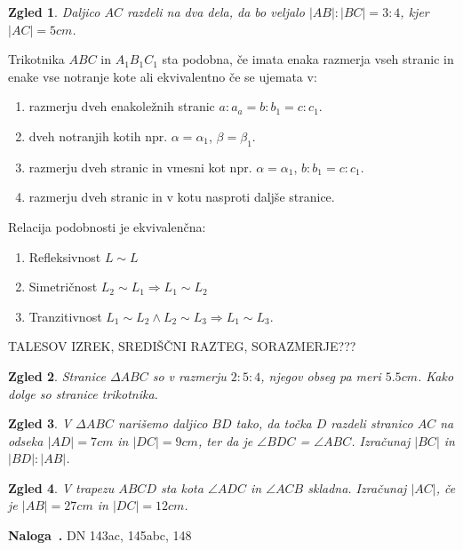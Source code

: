 \documentclass{article}
\newcounter{example}[section]
\newenvironment{example}[1][]{\refstepcounter{example}\par\medskip
   \noindent \textbf{Naloga~\theexample. #1} \rmfamily}{\medskip}
\newtheorem*{zgled}{Zgled}
\begin{document}
\begin{zgled}
    Daljico $AC$ razdeli na dva dela, da bo veljalo $|AB|:|BC|=3:4$, kjer $|AC|=5cm$.
\end{zgled}

Trikotnika $ABC$ in $A_1 B_1 C_1$ sta podobna, če imata enaka razmerja vseh stranic in enake vse notranje kote ali ekvivalentno če se ujemata v:
\begin{enumerate}[i]
    \item razmerju dveh enakoležnih stranic $a:a_a = b:b_1 =c: c_1$.
    \item dveh notranjih kotih npr. $\alpha = \alpha_1$, $\beta =\beta_1$.
    \item razmerju dveh stranic in vmesni kot npr. $\alpha =\alpha_1$, $b:b_1 = c: c_1$.
    \item razmerju dveh stranic in v kotu nasproti daljše stranice.
  \end{enumerate}

  Relacija podobnosti je ekvivalenčna:
  \begin{enumerate}[i]
    \item Refleksivnost $L\sim L$
    \item Simetričnost $L_2\sim L_1 \Rightarrow L_1 \sim L_2$
    \item Tranzitivnost $L_1 \sim L_2 \land L_2 \sim L_3 \Rightarrow L_1 \sim L_3$.
  \end{enumerate}

  TALESOV IZREK, SREDIŠČNI RAZTEG, SORAZMERJE???


\begin{zgled}
    Stranice $\Delta ABC$ so v razmerju $2:5:4$, njegov obseg pa meri $5.5cm$. Kako dolge so stranice trikotnika.
\end{zgled}

\begin{zgled}
    V $\Delta ABC$ narišemo daljico $BD$ tako, da točka $D$ razdeli stranico $AC$ na odseka $|AD|=7cm$ in $|DC|=9cm$, ter da je $\angle BDC$ = $\angle ABC$. Izračunaj $|BC|$ in $|BD|:|AB|$.
\end{zgled}


\begin{zgled}
    V trapezu $ABCD$ sta kota $\angle ADC$ in $\angle ACB$ skladna. Izračunaj $|AC|$, če je $|AB|=27cm$ in $|DC|=12cm$.
\end{zgled}

\begin{example}
    DN 143ac, 145abc, 148
\end{example}
\end{document}
